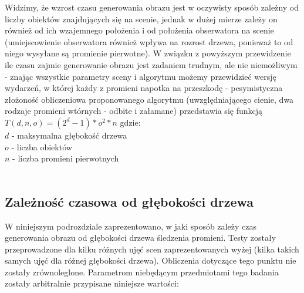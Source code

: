 Widzimy, że wzrost czasu generowania obrazu jest w oczywisty sposób zależny od liczby obiektów znajdujących się na scenie, jednak w dużej mierze zależy on również od ich wzajemnego położenia i od położenia obserwatora na scenie (umiejscowienie obserwatora również wpływa na rozrost drzewa, ponieważ to od niego wysyłane są promienie pierwotne). W związku z powyższym przewidzenie ile czasu zajmie generowanie obrazu jest zadaniem trudnym, ale nie niemożliwym - znając wszystkie parametry sceny i algorytmu możemy przewidzieć wersję wydarzeń, w której każdy z promieni napotka na przeszkodę - pesymistyczna złożoność obliczeniowa proponowanego algorytmu (uwzględniającego cienie, dwa rodzaje promieni wtórnych - odbite i załamane) przedstawia się funkcją $T(d,n,o) = (2^d - 1) * o^2 * n$ gdzie:
\\
$d$ - maksymalna głębokość drzewa \\
$o$ - liczba obiektów \\
$n$ - liczba promieni pierwotnych \\ 
\\

\subsection{Zależność czasowa od głębokości drzewa}

W niniejszym podrozdziale zaprezentowano, w jaki sposób zależy czas generowania obrazu od głębokości drzewa śledzenia promieni. Testy zostały przeprowadzone dla kilku różnych ujęć scen zaprezentowanych wyżej (kilka takich samych ujęć dla różnej głębokości drzewa). Obliczenia dotyczące tego punktu nie zostały zrównoleglone. Parametrom niebędącym przedmiotami tego badania zostały arbitralnie przypisane niniejsze wartości:

